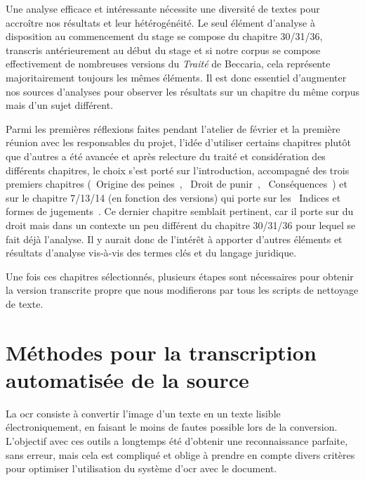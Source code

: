 
Une analyse efficace et intéressante nécessite une diversité de textes pour accroître nos résultats et leur hétérogénéité. Le seul élément d'analyse à disposition au commencement du stage se compose du chapitre 30/31/36, transcris antérieurement au début du stage et si notre corpus se compose effectivement de nombreuses versions du \emph{Traité} de Beccaria, cela représente majoritairement toujours les mêmes éléments. Il est donc essentiel d'augmenter nos sources d'analyses pour observer les résultats sur un chapitre du même corpus mais d'un sujet différent.

Parmi les premières réflexions faites pendant l'atelier de février et la première réunion avec les responsables du projet, l'idée d'utiliser certains chapitres plutôt que d'autres a été avancée et après relecture du traité et considération des différents chapitres, le choix s'est porté sur l'introduction, accompagné des trois premiers chapitres (\og~Origine des peines~\fg{}, \og~Droit de punir~\fg{}, \og~Conséquences~\fg{}) et sur le chapitre 7/13/14 (en fonction des versions) qui porte sur les \og~Indices et formes de jugements~\fg{}. Ce dernier chapitre semblait pertinent, car il porte sur du droit mais dans un contexte un peu différent du chapitre 30/31/36 pour lequel se fait déjà l'analyse. Il y aurait donc de l'intérêt à apporter d'autres éléments et résultats d'analyse vis-à-vis des termes clés et du langage juridique.

Une fois ces chapitres sélectionnés, plusieurs étapes sont nécessaires pour obtenir la version transcrite propre que nous modifierons par tous les scripts de nettoyage de texte.

\section{Méthodes pour la transcription automatisée de la source}
La \acrfull{ocr} consiste à convertir l'image d'un texte en un texte lisible électroniquement, en faisant le moins de fautes possible lors de la conversion. L'objectif avec ces outils a longtemps été d'obtenir une reconnaissance parfaite, sans erreur, mais cela est compliqué et oblige à prendre en compte divers critères pour optimiser l'utilisation du système d'\acrshort{ocr} avec le document. 

